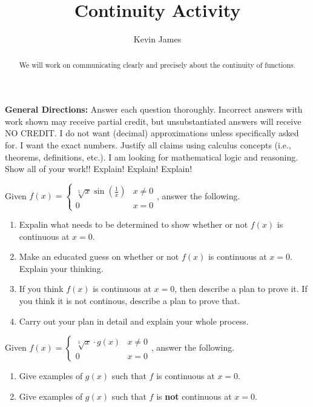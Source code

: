 \documentclass[handout,nooutcomes,noauthor,12pt]{ximera}
\author{Kevin James}
\title{Continuity Activity}
\begin{document}
	\begin{abstract}
		We will work on communicating clearly and precisely about the continuity of functions.
	\end{abstract}
	\maketitle
	\textbf{General Directions:}  Answer each question thoroughly.  Incorrect answers with work shown may receive partial credit, but unsubstantiated answers will receive NO CREDIT.  I do not want (decimal) approximations unless specifically asked for.  I want the exact numbers.  Justify all claims using calculus concepts (i.e., theorems, definitions, etc.).  I am looking for mathematical logic and reasoning.  Show all of your work!! Explain!  Explain!  Explain!
	
	\begin{problem}
		Given $ f(x) = \begin{cases}
		  \sqrt[5]{x} \sin\left(\frac{1}{x}\right) & x \ne 0 \\
		  0 & x=0
		\end{cases} $, answer the following.
		\begin{enumerate}
			\item Expalin what needs to be determined to show whether or not $f(x)$ is continuous at $x=0$.
			\item Make an educated guess on whether or not $f(x)$ is continuous at $x=0$.  Explain your thinking.
			
			\clearpage
			
			\item If you think $f(x)$ is continuous at $x=0$, then describe a plan to prove it.  If you think it is not continous, describe a plan to prove that.
			\item Carry out your plan in detail and explain your whole process.
		\end{enumerate}
	\end{problem}

	\clearpage
	
	\begin{problem}
		Given $ f(x) = \begin{cases}
		\sqrt[5]{x} \cdot g(x) & x \ne 0 \\
		0 & x=0
		\end{cases} $, answer the following.
		\begin{enumerate}
			\item Give examples of $g(x)$ such that $f$ is continuous at $x=0$.
			\vspace{\stretch{1}}
			\item Give examples of $g(x)$ such that $f$ is \textbf{not} continuous at $x=0$.
			\vspace{\stretch{1}}
		\end{enumerate}
		
	\end{problem}
\end{document}
